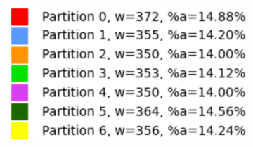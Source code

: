 \begin{figure}[h]
\centering
\begin{subfigure}{.33\textwidth}
    \centering
    \caption[short]{}
\end{subfigure}%
\begin{subfigure}{.33\textwidth}
    \centering
    \caption[short]{}
\end{subfigure}
\begin{subfigure}{.33\textwidth}
    \centering
    \includegraphics[width=0.9\linewidth]{images/results/m/2/results}

\end{subfigure}
\end{figure}
